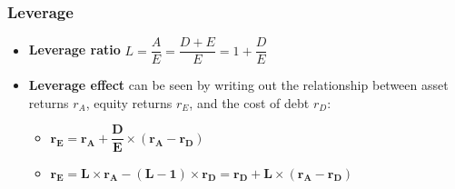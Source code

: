 \subsubsection{Leverage}
\begin{itemize}
\item \textbf{Leverage ratio} $L = \dfrac{A}{E} = \dfrac{D+E}{E} = 1 + \dfrac{D}{E}$
    
\item \textbf{Leverage effect} can be seen by writing out the relationship between asset returns $r_A$, equity returns $r_E$, and the cost of debt $r_D$:
    \begin{itemize}

    \item $\bm{r_E = r_A + \dfrac{D}{E} \times (r_A - r_D)}$

    \item $\bm{r_E = L \times r_A - (L-1) \times r_D = r_D + L \times (r_A - r_D)}$
    \end{itemize}


\end{itemize}
